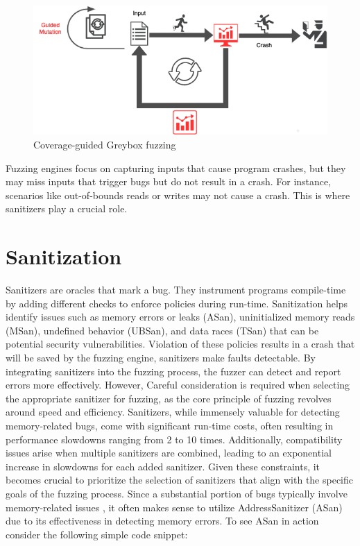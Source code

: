 \documentclass[a4paper,11pt,oneside]{report}
\begin{document}
\begin{figure}[ht]
	\centering
	\includegraphics[width=12cm]{figures/coverge_guided_red.png}
	\caption{Coverage-guided Greybox fuzzing}
	\label{fig:coverage_guided_diag}
\end{figure}


Fuzzing engines focus on capturing inputs that cause program crashes, 
but they may miss inputs that trigger bugs but do not result in a crash. 
For instance, scenarios like out-of-bounds reads or writes may not 
cause a crash. This is where sanitizers play a crucial role.

\section{Sanitization}

Sanitizers are oracles that mark a bug. They instrument programs compile-time
by adding different checks to enforce policies during run-time. 
Sanitization helps identify issues such as memory errors or leaks (ASan), uninitialized
memory reads (MSan), undefined behavior (UBSan), and data races (TSan)
that can be potential security vulnerabilities.
Violation of these policies results in a crash that will be saved by the fuzzing engine,
sanitizers make faults detectable. 
By integrating sanitizers into the fuzzing process, the fuzzer can detect 
and report errors more effectively. However, Careful consideration is 
required when selecting the appropriate sanitizer for fuzzing, 
as the core principle of fuzzing revolves around speed and efficiency. 
Sanitizers, while immensely valuable for detecting memory-related bugs, 
come with significant run-time costs, often resulting in performance 
slowdowns ranging from 2 to 10 times. Additionally, compatibility 
issues arise when multiple sanitizers are combined, leading to an 
exponential increase in slowdowns for each added sanitizer. 
Given these constraints, it becomes crucial to prioritize the selection 
of sanitizers that align with the specific goals of the fuzzing process. 
Since a substantial portion of bugs typically involve memory-related issues \cite{memorysafety2} \cite{memorysafety1}, 
it often makes sense to utilize AddressSanitizer (ASan) due to its effectiveness 
in detecting memory errors. To see ASan in action consider the following simple code snippet:
\end{document}
